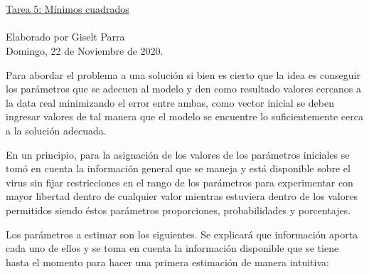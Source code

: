 \documentclass[11pt]{article}
\begin{document}
\begin{center}
 \Large \underline {\\ \\Tarea 5: Mínimos cuadrados}
  \\
  \\
 \small  {Elaborado por Giselt Parra}\\ 
 \footnotesize{Domingo, 22 de Noviembre de 2020.}
\end{center}

Para abordar el problema a una solución si bien es cierto que la idea es conseguir los parámetros que se adecuen al modelo y den como resultado  valores cercanos a la data real minimizando el error entre ambas, como vector inicial se deben ingresar valores de tal manera que el modelo se encuentre lo suficientemente cerca a la solución adecuada. 

En un principio, para la asignación de los valores de los parámetros iniciales se tomó en cuenta la información general que se maneja y está disponible sobre el virus sin fijar restricciones en el rango de los parámetros para experimentar con mayor libertad dentro de cualquier valor mientras estuviera dentro de los valores permitidos siendo éstos parámetros proporciones, probabilidades y porcentajes. 

Los parámetros a estimar son los siguientes. Se explicará que información aporta cada uno de ellos y se toma en cuenta la información disponible que se tiene hasta el momento para hacer una primera estimación de manera intuitiva:
\end{document}

